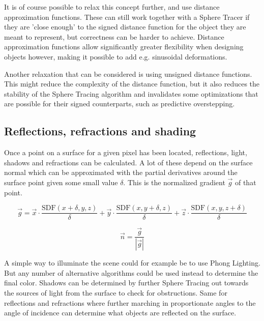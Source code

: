 			It is of course possible to relax this concept further, and use
			distance approximation functions. These can still work together 
			with a Sphere Tracer if they are 'close enough' to the signed 
			distance function for the object they are meant to represent, but
			correctness can be harder to achieve. Distance approximation 
			functions allow significantly greater flexibility when designing 
			objects however, making it possible to add e.g. sinusoidal 
			deformations\cite{Quilez, Keinert}.

			Another relaxation that can be considered is using unsigned 
			distance functions. This might reduce the complexity of the 
			distance function, but it also reduces the stability of the Sphere
			Tracing algorithm and invalidates some optimizations that are 
			possible for their signed counterparts, such as predictive 
			overstepping\cite{Korndorfer2014}.

		\subsection{Reflections, refractions and shading}

			Once a point on a surface for a given pixel has been located,
			reflections, light, shadows and refractions can be calculated.
			A lot of these depend on the surface normal which can be
			approximated with the partial derivatives around the surface point
			given some small value $\delta$. This is the normalized gradient
			$\vec{g}$ of that point.

			$$\vec{g} = \vec{x}\cdot\frac{\text{SDF}(x+\delta, y, z)}{\delta} +
			\vec{y}\cdot\frac{\text{SDF}(x, y+\delta, z)}{\delta} +
			\vec{z}\cdot\frac{\text{SDF}(x, y, z+\delta)}{\delta} $$

			$$\vec{n} = \frac{\vec{g}}{|\vec{g}|} $$

			A simple way to illuminate the scene could for example be to use
			Phong Lighting\cite{Phong1975}. But any number of alternative
			algorithms could be used instead to determine the final color.
			Shadows can be determined by further Sphere Tracing out towards the
			sources of light from the surface to check for obstructions. Same 
			for reflections	and refractions where further marching in 
			proportionate angles to	the angle of incidence can determine what 
			objects are reflected on the surface.
